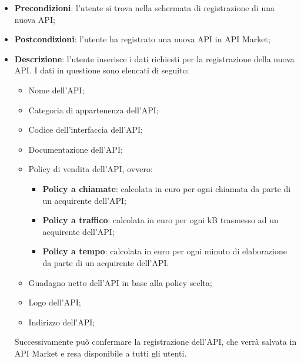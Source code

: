 \begin{itemize}
	\item \textbf{Precondizioni}: l'utente si trova nella schermata di registrazione di una nuova API;
	\item \textbf{Postcondizioni}: l'utente ha registrato una nuova API in API Market;
	\item \textbf{Descrizione}: l'utente inserisce i dati richiesti per la registrazione della nuova API. I dati in questione sono elencati di seguito:
	\begin{itemize}
		\item Nome dell'API;
		\item Categoria di appartenenza dell'API;
		\item Codice dell'interfaccia dell'API;
		\item Documentazione dell'API;
		\item Policy di vendita dell'API, ovvero:
		\begin{itemize}
			\item \textbf{Policy a chiamate}: calcolata in euro per ogni chiamata da parte di un acquirente dell'API;
			\item \textbf{Policy a traffico}: calcolata in euro per ogni kB trasmesso ad un acquirente dell'API;
			\item \textbf{Policy a tempo}: calcolata in euro per ogni minuto di elaborazione da parte di un acquirente dell'API.
		\end{itemize}
		\item Guadagno netto dell'API in base alla policy scelta;
		\item Logo dell'API;
		\item Indirizzo dell'API;
				
	\end{itemize}
	Successivamente può confermare la registrazione dell'API, che verrà salvata in API Market e resa disponibile a tutti gli utenti.
\end{itemize}
